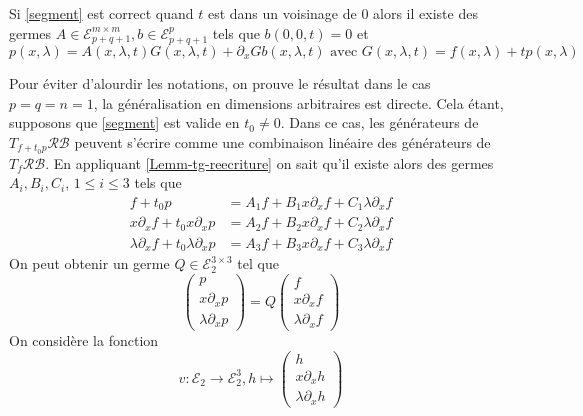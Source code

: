 \documentclass[memoire.tex]{subfiles}
\begin{document}
\begin{lemme}
    Si \ref{segment} est correct quand $t$ est dans un voisinage de $0$ alors il existe des germes
     $A\in\mathcal{E}_{p+q+1}^{m\times m},b\in\mathcal{E}_{p+q+1}^{ p }$ tels que $b(0,0,t)=0$ et 
    \begin{equation}\label{eq-locale}
        p(x,\lambda)= A(x,\lambda,t)G(x,\lambda,t) + \partial_x G b(x,\lambda,t)\text{ avec } G(x,\lambda,t)= f(x,\lambda)+ tp(x,\lambda)
    \end{equation}
\end{lemme}
\begin{preuve}
    Pour éviter d'alourdir les notations, on prouve le résultat dans le cas $p=q=n=1$, la généralisation en dimensions arbitraires est directe. Cela étant, supposons que \ref{segment} est valide en $t_0\neq 0$. Dans ce cas, les générateurs de $T_{f+t_0p} \mathcal{RB}$ peuvent s'écrire comme une combinaison linéaire des générateurs de $T_f \mathcal{RB}$. En appliquant \ref{Lemm-tg-reecriture} on sait qu'il existe alors des germes $A_i,B_i,C_i$, $1\leq i\leq 3$ tels que
    \begin{align*}
        f+t_0 p&=A_1 f +B_1 x\partial_x f +C_1\lambda \partial_x f\\
        x\partial_x f+t_0 x\partial_x p&
        =A_2 f +B_2 x\partial_x f +C_2\lambda \partial_x f\\
        \lambda \partial_xf +t_0 \lambda \partial_xp &=A_3 f +B_3 x\partial_x f +C_3\lambda \partial_x f
    \end{align*}
    On peut obtenir un germe $Q\in\mathcal{E}_2^{3\times 3}$
    tel que
    \begin{equation*}
        \begin{pmatrix}
            p \\ x\partial_x p \\ \lambda \partial_xp
        \end{pmatrix}
        = Q
            \begin{pmatrix}
            f \\ x\partial_x f \\ \lambda \partial_x f
        \end{pmatrix}
    \end{equation*}
    On considère la fonction
    \begin{equation*}
        v: \mathcal{E}_2\rightarrow \mathcal{E}_{2}^3, h\mapsto
        \begin{pmatrix}
            h\\ x \partial_x h\\  \lambda \partial_x h

\end{pmatrix}
\end{equation*}
\end{preuve}
\end{document}
